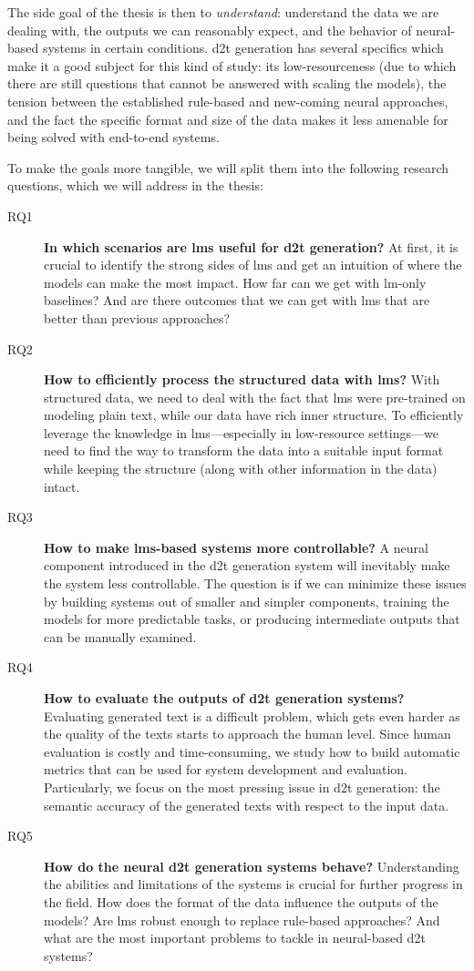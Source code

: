 The side goal of the thesis is then to \textit{understand}: understand the data we are dealing with, the outputs we can reasonably expect, and the behavior of neural-based systems in certain conditions. \ac{d2t} generation has several specifics which make it a good subject for this kind of study: its low-resourceness (due to which there are still questions that cannot be answered with scaling the models), the tension between the established rule-based and new-coming neural approaches, and the fact the specific format and size of the data makes it less amenable for being solved with end-to-end systems.

To make the goals more tangible, we will split them into the following research questions, which we will address in the thesis:

\begin{description}
    \item[RQ1] \textbf{In which scenarios are \acp{lm} useful for \ac{d2t} generation?} At first, it is crucial to identify the strong sides of \acp{lm} and get an intuition of where the models can make the most impact. How far can we get with \ac{lm}-only baselines? And are there outcomes that we can get with \acp{lm} that are better than previous approaches?
    \item[RQ2] \textbf{How to efficiently process the structured data with \acp{lm}?} With structured data, we need to deal with the fact that \acp{lm} were pre-trained on modeling plain text, while our data have rich inner structure. To efficiently leverage the knowledge in \acp{lm}---especially in low-resource settings---we need to find the way to transform the data into a suitable input format while keeping the structure (along with other information in the data) intact.
    \item[RQ3] \textbf{How to make \acp{lm}-based systems more controllable?} A neural component introduced in the \ac{d2t} generation system will inevitably make the system less controllable. The question is if we can minimize these issues by building systems out of smaller and simpler components, training the models for more predictable tasks, or producing intermediate outputs that can be manually examined.
    \item[RQ4] \textbf{How to evaluate the outputs of \ac{d2t} generation systems?} Evaluating generated text is a difficult problem, which gets even harder as the quality of the texts starts to approach the human level. Since human evaluation is costly and time-consuming, we study how to build automatic metrics that can be used for system development and evaluation. Particularly, we focus on the most pressing issue in \ac{d2t} generation: the semantic accuracy of the generated texts with respect to the input data.
    \item[RQ5] \textbf{How do the neural \ac{d2t} generation systems behave?} Understanding the abilities and limitations of the systems is crucial for further progress in the field. How does the format of the data influence the outputs of the models? Are \acp{lm} robust enough to replace rule-based approaches? And what are the most important problems to tackle in neural-based \ac{d2t} systems?
\end{description}



